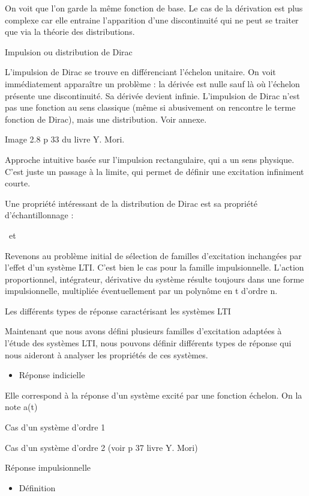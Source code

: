 \documentclass[]{article}
\begin{document}
On voit que l'on garde la même fonction de base. Le cas de la dérivation
est plus complexe car elle entraine l'apparition d'une discontinuité qui
ne peut se traiter que via la théorie des distributions.

Impulsion ou distribution de Dirac

L'impulsion de Dirac se trouve en différenciant l'échelon unitaire. On
voit immédiatement apparaître un problème : la dérivée est nulle sauf là
où l'échelon présente une discontinuité. Sa dérivée devient infinie.
L'impulsion de Dirac n'est pas une fonction au sens classique (même si
abusivement on rencontre le terme fonction de Dirac), mais une
distribution. Voir annexe.

Image 2.8 p 33 du livre Y. Mori.

Approche intuitive basée sur l'impulsion rectangulaire, qui a un sens
physique. C'est juste un passage à la limite, qui permet de définir une
excitation infiniment courte.

Une propriété intéressant de la distribution de Dirac est sa propriété
d'échantillonnage :

~et~

Revenons au problème initial de sélection de familles d'excitation
inchangées par l'effet d'un système LTI. C'est bien le cas pour la
famille impulsionnelle. L'action proportionnel, intégrateur, dérivative
du système résulte toujours dans une forme impulsionnelle, multipliée
éventuellement par un polynôme en t d'ordre n.

Les différents types de réponse caractérisant les systèmes LTI

Maintenant que nous avons défini plusieurs familles d'excitation
adaptées à l'étude des systèmes LTI, nous pouvons définir différents
types de réponse qui nous aideront à analyser les propriétés de ces
systèmes.

\begin{itemize}
\itemsep1pt\parskip0pt
\item
  Réponse indicielle
\end{itemize}

Elle correspond à la réponse d'un système excité par une fonction
échelon. On la note a(t)

Cas d'un système d'ordre 1

Cas d'un système d'ordre 2 (voir p 37 livre Y. Mori)

Réponse impulsionnelle

\begin{itemize}
\itemsep1pt\parskip0pt
\item
  Définition
\end{itemize}
\end{document}
